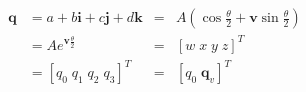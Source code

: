 \documentclass[preview]{standalone}
\begin{document}
\newcommand{\vect}[1] {\mathbf{#1}}
\begin{align*}
\vect{q} &= a + b\vect{i} + c\vect{j} + d\vect{k} &=& A\left(\cos{\frac{\theta}{2}} + \vect{v}\sin{\frac{\theta}{2}}\right) \\
         &= Ae^{\vect{v}\frac{\theta}{2}} &=& \left[w \; x \; y \; z \right]^T \\
         &= \left[q_0 \; q_1 \; q_2 \; q_3 \right]^T &=& \left[q_0 \; \vect{q}_v \right]^T
\end{align*}
\end{document}
